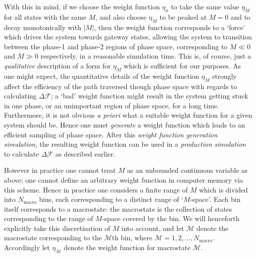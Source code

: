 \documentclass{report}
\begin{document}
With this in mind, if we choose the weight function $\eta_{\sigma}$ to take the same value $\eta_{M}$ 
for all states with the same $M$, and also choose $\eta_{M}$ to be peaked at $M=0$ and to decay monotonically with 
$|M|$, then the weight function corresponds to a `force' which drives the system towards gateway states, allowing the system to transition between
the phase-1 and phase-2 regions of phase space, corresponding to $M\ll 0$ and $M\gg 0$ respectively, in a reasonable simulation time.
This is, of course, just a \emph{qualitative} description of a form for $\eta_{M}$ which is sufficient for our purposes. As one might expect, 
the quantitative details of the weight function $\eta_{M}$ strongly affect the efficiency of the path traversed though phase space with regards 
to calculating $\Delta \mathcal{F}$; a `bad' weight function might result in the system getting stuck in one phase, or an unimportant region of phase 
space, for a long time. Furthermore, it is not obvious \emph{a priori} what a suitable weight function for a given system should be. Hence one must 
\emph{generate} a weight function which leads to an efficient sampling of phase space. After this \emph{weight function generation simulation},
the resulting weight function can be used in a \emph{production simulation} to calculate $\Delta \mathcal{F}$ as described earlier.

However in practice one cannot treat $M$ as an unbounded continuous variable as above; one cannot define an arbitrary weight function in computer
memory via this scheme. Hence in practice one considers a finite range of $M$ which is divided into $N_{\text{macro}}$ bins, each 
corresponding to a distinct range of `$M$-space'. Each bin itself corresponds to a macrostate: the macrostate is the collection of states corresponding to the 
range of $M$-space covered by the bin. We will henceforth explicitly take this discretisation of $M$ into account, and let $\mathcal{M}$ denote the 
macrostate corresponding to the $\mathcal{M}$th bin, where $\mathcal{M}=1,2,\dotsc,N_{\text{macro}}$. Accordingly let 
$\eta_{\mathcal{M}}$ denote the weight function for macrostate $\mathcal{M}$.
\end{document}
